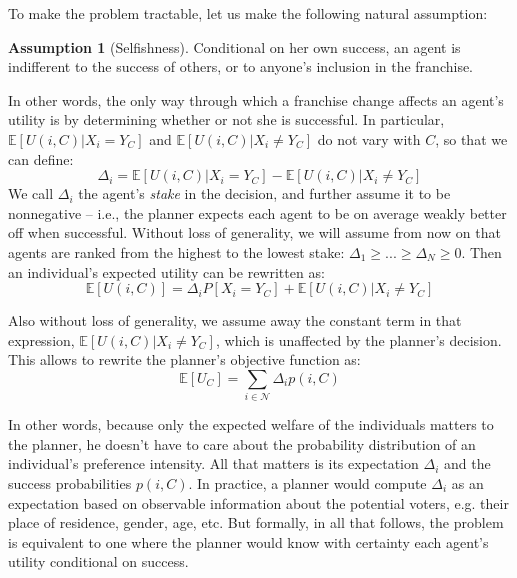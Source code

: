 \documentclass{article}
\theoremstyle{definition}
\theoremstyle{theorem}
\newtheorem{assumption}{Assumption}
\begin{document}
To make the problem tractable, let us make the following natural assumption:
\begin{assumption}[Selfishness]
\label{assumption:selfishness}
    Conditional on her own success, an agent is indifferent to the success of others, or to anyone's inclusion in the franchise.
\end{assumption}
In other words, the only way through which a franchise change affects an agent's utility is by determining whether or not she is successful. In particular, $\mathbb{E}[U(i,C)|X_i = Y_C]$ and $\mathbb{E}[U(i,C)|X_i \neq Y_C]$ do not vary with $C$, so that we can define:
\begin{equation*}
    \Delta_i = \mathbb{E}[U(i,C)|X_i = Y_C] - \mathbb{E}[U(i,C)|X_i \neq Y_C]
\end{equation*}
We call $\Delta_i$ the agent's \textit{stake} in the decision, and further assume it to be nonnegative -- i.e., the planner expects each agent to be on average weakly better off when successful. Without loss of generality, we will assume from now on that agents are ranked from the highest to the lowest stake: $\Delta_1 \geq  ... \geq \Delta_N \geq 0$. Then an individual's expected utility can be rewritten as:
\begin{equation*}
    \mathbb{E}[U(i,C)] = \Delta_i P[X_i = Y_C] + \mathbb{E}[U(i,C)|X_i \neq Y_C]
\end{equation*}


Also without loss of generality, we assume away the constant term in that expression, $\mathbb{E}[U(i,C)|X_i \neq Y_C]$, which is unaffected by the planner's decision. This allows to rewrite the planner's objective function as:
\begin{equation}
\label{eq:expected-aggregate-utility}
    \mathbb{E}[U_C] = \sum_{i \in \mathcal{N}} \Delta_i p(i,C)
\end{equation}

In other words, because only the expected welfare of the individuals matters to the planner, he doesn't have to care about the probability distribution of an individual's preference intensity. All that matters is its expectation $\Delta_i$ and the success probabilities $p(i,C)$. In practice, a planner would compute $\Delta_i$ as an expectation based on observable information about the potential voters, e.g. their place of residence, gender, age, etc. But formally, in all that follows, the problem is equivalent to one where the planner would know with certainty each agent's utility conditional on success.
\end{document}
